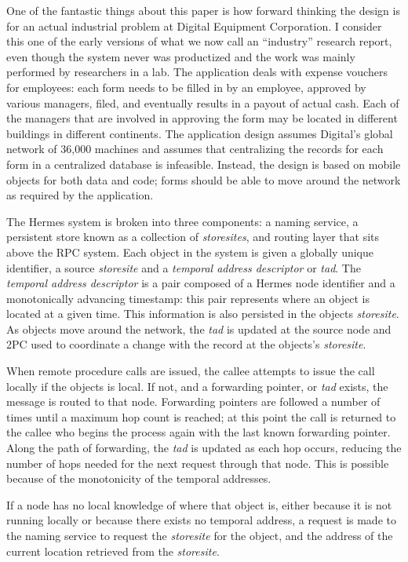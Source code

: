 One of the fantastic things about this paper is how forward thinking the design is for an actual industrial problem at Digital Equipment Corporation.  I consider this one of the early versions of what we now call an ``industry'' research report, even though the system never was productized and the work was mainly performed by researchers in a lab.  The application deals with expense vouchers for employees: each form needs to be filled in by an employee, approved by various managers, filed, and eventually results in a payout of actual cash.  Each of the managers that are involved in approving the form may be located in different buildings in different continents.  The application design assumes Digital's global network of 36,000 machines and assumes that centralizing the records for each form in a centralized database is infeasible.  Instead, the design is based on mobile objects for both data and code; forms should be able to move around the network as required by the application.  

The Hermes system is broken into three components: a naming service, a persistent store known as a collection of \textit{storesites}, and routing layer that sits above the RPC system. Each object in the system is given a globally unique identifier, a source \textit{storesite} and a \textit{temporal address descriptor} or \textit{tad}.  The \textit{temporal address descriptor} is a pair composed of a Hermes node identifier and a monotonically advancing timestamp: this pair represents where an object is located at a given time.  This information is also persisted in the objects \textit{storesite}.  As objects move around the network, the \textit{tad} is updated at the source node and 2PC used to coordinate a change with the record at the objects's \textit{storesite}.

When remote procedure calls are issued, the callee attempts to issue the call locally if the objects is local.  If not, and a forwarding pointer, or \textit{tad} exists, the message is routed to that node.  Forwarding pointers are followed a number of times until a maximum hop count is reached; at this point the call is returned to the callee who begins the process again with the last known forwarding pointer.  Along the path of forwarding, the \textit{tad} is updated as each hop occurs, reducing the number of hops needed for the next request through that node.  This is possible because of the monotonicity of the temporal addresses.

If a node has no local knowledge of where that object is, either because it is not running locally or because there exists no temporal address, a request is made to the naming service to request the \textit{storesite} for the object, and the address of the current location retrieved from the \textit{storesite}.

